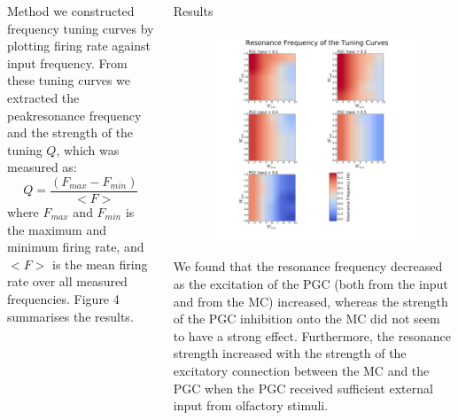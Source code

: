 \documentclass[final,hyperref={pdfpagelabels=false}]{beamer}
\begin{document}
\begin{frame}{}
\begin{columns}[t]
\begin{column}{.48\linewidth}
      		
      		
      		
      		
      		
      		
      		
      		
      		
      		
      		
      		
      	\begin{block}{Method} 
      	      	 we constructed frequency tuning curves by plotting firing rate against input frequency.
		From these tuning curves we extracted the peakresonance frequency and the strength of the tuning $Q$, which was measured as:
		\begin{equation}
		Q = \frac{(F_{max} - F_{min})}{<F>}
		\end{equation}
		where $F_{max}$ and $F_{min}$ is the maximum and minimum firing rate, and $<F>$ is the mean firing rate over all measured frequencies. Figure 4 summarises the results.
      \end{block}
    \end{column}
    \begin{column}{.48\linewidth}
      \begin{block}{Results}
      	\begin{figure}
      		\center
      		\includegraphics[scale=0.5]{images/Contour_plot_tuning_frequency}
      		\end{figure} 
        We found that the resonance frequency decreased as the excitation of the PGC (both from the input and from the MC) increased, whereas the strength of the PGC inhibition onto the MC did not seem to have a strong effect. 
        Furthermore, the resonance strength increased with the strength of the excitatory connection between the MC and the PGC when the PGC received sufficient external input from olfactory stimuli.
      \end{block}


\end{column}
\end{columns}
\end{frame}
\end{document}
